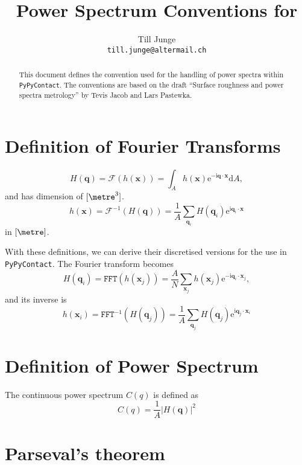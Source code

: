 \documentclass[a4paper,twosides]{article}
\title{Power Spectrum Conventions for \pypycontact}
\author{Till Junge\\\texttt{till.junge@altermail.ch}}
\newcommand{\pypycontact}{\texttt{PyPyContact}}
\renewcommand{\d}{\ensuremath{\mathrm{d}}}
\newcommand{\e}{\ensuremath{\mathrm{e}}}
\renewcommand{\i}{\ensuremath{\mathrm{i}}}
\renewcommand{\vec}[1]{\ensuremath{\boldsymbol{#1}}}
\newcommand{\abs}[1]{\ensuremath{\left|#1\right|}}
\begin{document}
\maketitle
\begin{abstract}
  This document defines the convention used for the handling of power spectra within \pypycontact. The conventions are based on the draft ``Surface roughness and power spectra metrology'' by Tevis Jacob and Lars Pastewka.
\end{abstract}

\section{Definition of Fourier Transforms}
\label{sec:fourier_transforms}


\begin{equation}
  H(\vec q) = \mathcal{F}(h(\vec x)) = \int_Ah(\vec x)\e^{-\i\vec q\cdot\vec x}\d A,
  \label{eq:four}
\end{equation}
and has dimension of $[\metre^3]$.
\begin{equation}
  h(\vec x) = \mathcal{F}^{-1}(H(\vec q)) = \frac{1}{A} \sum_{\vec q_i} H(\vec q_i)\e^{\i\vec q_i\cdot\vec x}
 \label{eq:ifour}
\end{equation}
in $[\metre]$.

With these definitions, we can derive their discretised versions for the use in \pypycontact. The Fourier transform becomes
\begin{equation}
  H(\vec q_i) = \mathtt{FFT}(h(\vec x_j)) = \frac{A}{N}\sum_{\vec x_j}h(\vec x_j)\e^{-\i\vec q_i\cdot\vec x_j},
  \label{eq:fft}
\end{equation}
and its inverse is
\begin{equation}
  \label{eq:ifft}
  h(\vec x_i) = \mathtt{FFT}^{-1}(H(\vec q_j))= \frac{1}{A}\sum_{\vec q_j}H(\vec q_j)\e^{\i\vec q_j\cdot\vec x_i}
\end{equation}

\section{Definition of Power Spectrum}
\label{sec:power_spectrum}

The continuous power spectrum $C(q)$ is defined as
\begin{equation}
  \label{eq:cont_pow_spec}
  C(q) = \frac{1}{A} \abs{H(\vec q)}^2
\end{equation}

\section{Parseval's theorem}
\label{sec:parseval}
\end{document}
